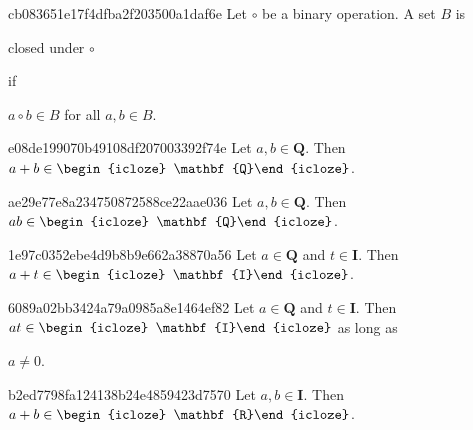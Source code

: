 \begin{note}{cb083651e17f4dfba2f203500a1daf6e}
    Let \({ \circ }\) be a binary operation. A set \({ B }\) is \begin{icloze}{2}closed under \({ \circ }\)\end{icloze} if
    \begin{icloze}{1}
        \begin{center}
            \({ a \circ b \in B }\) for all \({ a, b \in B }\).
        \end{center}
    \end{icloze}
\end{note}

\begin{note}{e08de199070b49108df207003392f74e}
    Let \({ a, b \in \mathbf{Q} }\).
    Then \({ a + b \in \begin{icloze}{1}\mathbf{Q}\end{icloze} }\).
\end{note}

\begin{note}{ae29e77e8a234750872588ce22aae036}
    Let \({ a, b \in \mathbf{Q} }\).
    Then \({ ab \in \begin{icloze}{1}\mathbf{Q}\end{icloze} }\).
\end{note}

\begin{note}{1e97c0352ebe4d9b8b9e662a38870a56}
    Let \({ a \in \mathbf{Q} }\) and \({ t \in \mathbf{I} }\).
    Then \({ a + t \in \begin{icloze}{1}\mathbf{I}\end{icloze} }\).
\end{note}

\begin{note}{6089a02bb3424a79a0985a8e1464ef82}
    Let \({ a \in \mathbf{Q} }\) and \({ t \in \mathbf{I} }\).
    Then \({ at \in \begin{icloze}{1}\mathbf{I}\end{icloze} }\) as long as \begin{icloze}{2}\({ a \neq 0 }\).\end{icloze}
\end{note}

\begin{note}{b2ed7798fa124138b24e4859423d7570}
    Let \({ a, b \in \mathbf{I} }\).
    Then \({ a + b \in \begin{icloze}{1}\mathbf{R}\end{icloze} }\).
\end{note}

